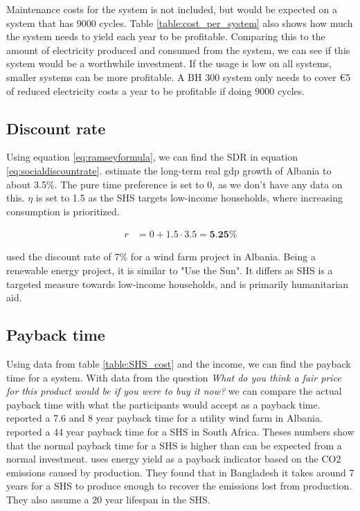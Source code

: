 Maintenance costs for the system is not included, but would be expected on a system that has 9000 cycles. Table \ref{table:cost_per_system} also shows how much the system needs to yield each year to be profitable. Comparing this to the amount of electricity produced and consumed from the system, we can see if this system would be a worthwhile investment. If the usage is low on all systems, smaller systems can be more profitable. A BH 300 system only needs to cover €5 of reduced electricity costs a year to be profitable if doing 9000 cycles. 

\subsection{Discount rate}
Using equation \eqref{eq:ramseyformula}, we can find the SDR in equation \eqref{eq:socialdiscountrate}. \citep{internationalmonetaryfundALBANIA2024ARTICLE2025} estimate the long-term real \acrfull{gdp} growth of Albania to about 3.5\%. The pure time preference is set to 0, as we don't have any data on this. $\eta$ is set to 1.5 as the SHS targets low-income households, where increasing consumption is prioritized. 

\begin{align}
    r & =  0 + 1.5\cdot3.5 = \textbf{5.25\%}
    \label{eq:socialdiscountrate}
\end{align}

\citep{inproceedings} used the discount rate of 7\% for a wind farm project in Albania. Being a renewable energy project, it is similar to "Use the Sun". It differs as SHS is a targeted measure towards low-income households, and is primarily humanitarian aid.
\subsection{Payback time}
Using data from table \ref{table:SHS_cost} and the income, we can find the payback time for a system. With data from the question \textit{What do you think a fair price for this product would be if you were to buy it now?} we can compare the actual payback time with what the participants would accept as a payback time. \citep{inproceedings} reported a 7.6 and 8 year payback time for a utility wind farm in Albania. \citep{mannesEnduserEvaluationSolar2017} reported a 44 year payback time for a SHS in South Africa. Theses numbers show that the normal payback time for a SHS is higher than can be expected from a normal investment. \citep{hoqueEvaluationEnergyPayback2014} uses energy yield as a payback indicator based on the CO2 emissions caused by production. They found that in Bangladesh it takes around 7 years for a SHS to produce enough to recover the emissions lost from production. They also assume a 20 year lifespan in the SHS. 

